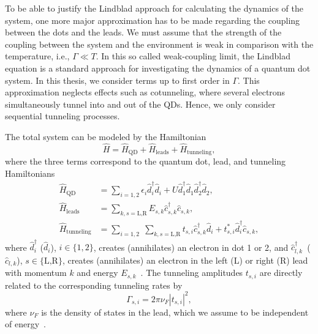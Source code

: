 \documentclass[../main.tex]{subfiles}
\begin{document}
To be able to justify the Lindblad approach for calculating the dynamics of the system, one more major approximation has to be made regarding the coupling between the dots and the leads. We must assume that the strength of the coupling between the system and the environment is weak in comparison with the temperature, i.e., $\Gamma \ll T$. In this so called weak-coupling limit, the Lindblad equation is a standard approach for investigating the dynamics of a quantum dot system. In this thesis, we consider terms up to first order in  $\Gamma$. This approximation neglects effects such as cotunneling, where several electrons simultaneously tunnel into and out of the QDs. Hence, we only consider sequential tunneling processes.

The total system can be modeled by the Hamiltonian
\begin{equation}
    \hat H = \hat H_\text{QD} + \hat H_\text{leads} + \hat H_\text{tunneling},
\end{equation}
where the three terms correspond to the quantum dot, lead, and tunneling Hamiltonians
\begin{equation}
    \begin{split}
        \hat H_\text{QD} &= \sum_{i=1,2} \epsilon_i \hat d_i^\dag \hat d_i  + U\hat d_1^\dag \hat d_1 \hat d_2^\dag \hat d_2, \\
        \hat H_\text{leads} &= \sum_{k,s=\text{L,R}} E_{s, k} \hat c_{s,k}^\dag \hat c_{s,k}, \\
        \hat H_\text{tunneling} &= \sum_{i=1,2} \; \sum_{k,s=\text{L,R}} t_{s,i} \hat c_{s,k}^\dag \hat d_i + t_{s,i}^* \hat d_i^\dag \hat c_{s,k},
    \end{split}
\end{equation}
where $\hat d_i^\dag$ ($\hat d_i$), $i\in\{1,2\}$, creates (annihilates) an electron in dot 1 or 2, and $\hat c_{l,k}^\dag$~($\hat c_{l,k}$), $s\in\{\text{L,R}\}$, creates (annihilates) an electron in the left (L) or right (R) lead with momentum $k$ and energy $E_{s,k}$~\cite{doubledot}. The tunneling amplitudes $t_{s,i}$ are directly related to the corresponding tunneling rates by 
\begin{equation}
    \Gamma_{s,i} = 2\pi\nu_F|t_{s,i}|^2,
\end{equation}
where $\nu_F$ is the density of states in the lead, which we assume to be independent of energy~\cite{perlind}.
\end{document}
